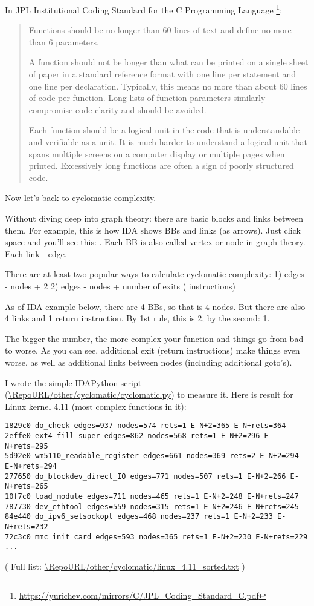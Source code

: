 In JPL Institutional Coding Standard for the C Programming Language
\footnote{\url{https://yurichev.com/mirrors/C/JPL_Coding_Standard_C.pdf}}:

\begin{framed}
\begin{quotation}
Functions should be no longer than 60 lines of text and define no more than 6 parameters.

A function should not be longer than what can be printed on a single sheet of paper in a standard reference format with one line per statement and one line per declaration. Typically, this means no more than about 60 lines of code per function. Long lists of function parameters similarly compromise code clarity and should be avoided.

Each function should be a logical unit in the code that is understandable and verifiable as a unit. It is much harder to understand a logical unit that spans multiple screens on a computer display or multiple pages when printed. Excessively long functions are often a sign of poorly structured code.
\end{quotation}
\end{framed}

Now let's back to cyclomatic complexity.

Without diving deep into graph theory: there are basic blocks and links between them.
For example, this is how IDA shows \ac{BB}s and links (as arrows).
Just click space and you'll see this: .
Each \ac{BB} is also called vertex or node in graph theory. Each link - edge.

There are at least two popular ways to calculate cyclomatic complexity:
1) edges - nodes + 2
2) edges - nodes + number of exits ( instructions)

As of IDA example below, there are 4 \ac{BB}s, so that is 4 nodes. But there are also 4 links and 1 return instruction.
By 1st rule, this is 2, by the second: 1.

The bigger the number, the more complex your function and things go from bad to worse.
As you can see, additional exit (return instructions) make things even worse,
as well as additional links between nodes (including additional goto's).

I wrote the simple IDAPython script (\url{\RepoURL/other/cyclomatic/cyclomatic.py}) to measure it.
Here is result for Linux kernel 4.11 (most complex functions in it):

\begin{lstlisting}
1829c0 do_check edges=937 nodes=574 rets=1 E-N+2=365 E-N+rets=364
2effe0 ext4_fill_super edges=862 nodes=568 rets=1 E-N+2=296 E-N+rets=295
5d92e0 wm5110_readable_register edges=661 nodes=369 rets=2 E-N+2=294 E-N+rets=294
277650 do_blockdev_direct_IO edges=771 nodes=507 rets=1 E-N+2=266 E-N+rets=265
10f7c0 load_module edges=711 nodes=465 rets=1 E-N+2=248 E-N+rets=247
787730 dev_ethtool edges=559 nodes=315 rets=1 E-N+2=246 E-N+rets=245
84e440 do_ipv6_setsockopt edges=468 nodes=237 rets=1 E-N+2=233 E-N+rets=232
72c3c0 mmc_init_card edges=593 nodes=365 rets=1 E-N+2=230 E-N+rets=229
...
\end{lstlisting}
( Full list: \url{\RepoURL/other/cyclomatic/linux_4.11_sorted.txt} )

